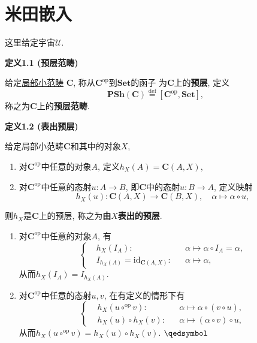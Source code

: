 \documentclass[UTF8]{ctexart}
\begin{document}
\setlength{\abovedisplayskip}{1pt}
\setlength{\belowdisplayskip}{1pt}

\section{米田嵌入}

这里给定宇宙$\mathcal{U}$.

\vspace{10pt}

\hypertarget{sec:定义1.1}{}
\noindent\textbf{定义1.1 (预层范畴)}

给定\href{../01 范畴、函子与自然变换/01 范畴#nameddest=sec:定义1.2}{局部小范畴}
$\mathbf{C}$, 称从$\mathbf{C}^{\mathrm{op}}$到$\mathbf{Set}$的函子
为$\mathbf{C}$上的\textbf{预层}, 定义
\[
    \mathbf{PSh}(\mathbf{C})\overset{\mathrm{def}}{=}
    [\mathbf{C}^{\mathrm{op}},\mathbf{Set}],
\]
称之为$\mathbf{C}$上的\textbf{预层范畴}.

\vspace{10pt}

\hypertarget{sec:定义1.2}{}
\noindent\textbf{定义1.2 (表出预层)}

给定局部小范畴$\mathbf{C}$和其中的对象$X$,
\begin{enumerate}
    \item 对$\mathbf{C}^{\mathrm{op}}$中任意的对象$A$,
    定义$h_X(A)=\mathbf{C}(A,X)$,
    \item 对$\mathbf{C}^{\mathrm{op}}$中任意的态射$u:A\to B$,
    即$\mathbf{C}$中的态射$u:B\to A$, 定义映射
    \[
        h_X(u):\mathbf{C}(A,X)\to\mathbf{C}(B,X),\quad
        \alpha\mapsto\alpha\circ u,
    \]
\end{enumerate}
则$h_X$是$\mathbf{C}$上的预层, 称之为\textbf{由}$X$\textbf{表出的预层}.


\begin{enumerate}
    \item 对$\mathbf{C}^{\mathrm{op}}$中任意的对象$A$, 有
    \[\left\{\begin{aligned}
        &h_X(I_A):&&\alpha\mapsto\alpha\circ I_A=\alpha,\\[-3pt]
        &I_{h_X(A)}=\mathrm{id}_{\mathbf{C}(A,X)}:&&\alpha\mapsto\alpha,
    \end{aligned}\right.\]
    从而$h_X(I_A)=I_{h_X(A)}$.
    \item 对$\mathbf{C}^{\mathrm{op}}$中任意的态射$u,v$, 在有定义的情形下有
    \[\left\{\begin{aligned}
        &h_X(u\circ^{\mathrm{op}}v):&&\alpha\mapsto\alpha\circ(v\circ u),\\[-3pt]
        &h_X(u)\circ h_X(v):&&\alpha\mapsto(\alpha\circ v)\circ u,
    \end{aligned}\right.\]
    从而$h_X(u\circ^\mathrm{op}v)=h_X(u)\circ h_X(v)$. \hfill $\qedsymbol$
\end{enumerate}
\end{document}
